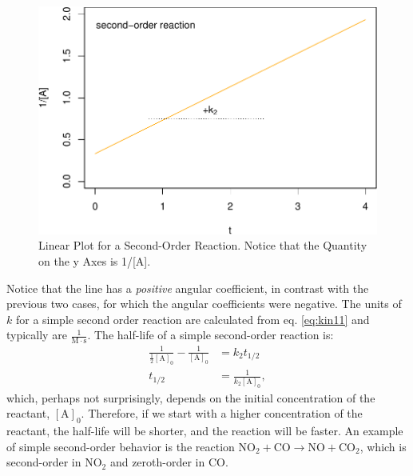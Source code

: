 \documentclass[
  9pt,
]{extbook}
\theoremstyle{definition}
\theoremstyle{definition}
\theoremstyle{definition}
\theoremstyle{remark}
\begin{document}
\begin{figure}

{\centering \includegraphics{pchem1_files/figure-latex/figk4-1} 

}

\caption{Linear Plot for a Second-Order Reaction. Notice that the Quantity on the y Axes is 1/[A].}\label{fig:figk4}
\end{figure}

Notice that the line has a \emph{positive} angular coefficient, in contrast with the previous two cases, for which the angular coefficients were negative. The units of \(k\) for a simple second order reaction are calculated from eq. \eqref{eq:kin11} and typically are \(\frac{1}{\mathrm{M}\cdot \mathrm{s}}\).
The half-life of a simple second-order reaction is:
\begin{equation}
\begin{aligned}
\frac{1}{\frac{1}{2}[\mathrm{A}]_0}-\frac{1}{[\mathrm{A}]_0} &= k_2 t_{1/2} \\
t_{1/2} &= \frac{1}{k_2 [\mathrm{A}]_0},
\end{aligned}
\label{eq:kin12}
\end{equation}
which, perhaps not surprisingly, depends on the initial concentration of the reactant, \([\mathrm{A}]_0\). Therefore, if we start with a higher concentration of the reactant, the half-life will be shorter, and the reaction will be faster. An example of simple second-order behavior is the reaction \(\mathrm{NO}_2 + \mathrm{CO} \rightarrow \mathrm{NO} + \mathrm{CO}_2\), which is second-order in \(\mathrm{NO}_2\) and zeroth-order in \(\mathrm{CO}\).
\end{document}
